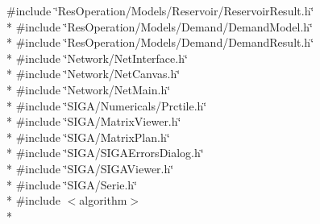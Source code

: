 {\ttfamily \#include \char`\"{}Res\+Operation/\+Models/\+Reservoir/\+Reservoir\+Result.\+h\char`\"{}}\\*
{\ttfamily \#include \char`\"{}Res\+Operation/\+Models/\+Demand/\+Demand\+Model.\+h\char`\"{}}\\*
{\ttfamily \#include \char`\"{}Res\+Operation/\+Models/\+Demand/\+Demand\+Result.\+h\char`\"{}}\\*
{\ttfamily \#include \char`\"{}Network/\+Net\+Interface.\+h\char`\"{}}\\*
{\ttfamily \#include \char`\"{}Network/\+Net\+Canvas.\+h\char`\"{}}\\*
{\ttfamily \#include \char`\"{}Network/\+Net\+Main.\+h\char`\"{}}\\*
{\ttfamily \#include \char`\"{}S\+I\+G\+A/\+Numericals/\+Prctile.\+h\char`\"{}}\\*
{\ttfamily \#include \char`\"{}S\+I\+G\+A/\+Matrix\+Viewer.\+h\char`\"{}}\\*
{\ttfamily \#include \char`\"{}S\+I\+G\+A/\+Matrix\+Plan.\+h\char`\"{}}\\*
{\ttfamily \#include \char`\"{}S\+I\+G\+A/\+S\+I\+G\+A\+Errors\+Dialog.\+h\char`\"{}}\\*
{\ttfamily \#include \char`\"{}S\+I\+G\+A/\+S\+I\+G\+A\+Viewer.\+h\char`\"{}}\\*
{\ttfamily \#include \char`\"{}S\+I\+G\+A/\+Serie.\+h\char`\"{}}\\*
{\ttfamily \#include $<$algorithm$>$}\\*
